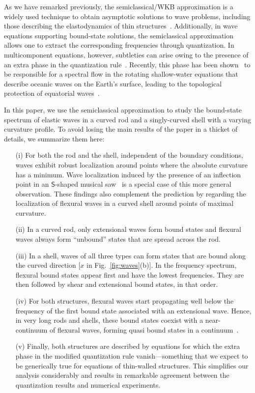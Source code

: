 As we have remarked previously, the semiclassical/WKB approximation is a widely used technique to obtain asymptotic solutions to wave problems, including those describing the elastodynamics of thin structures~\cite{pierce1970,nielsen2014,sndergaard2016,mohammed2021}.
Additionally, in wave equations supporting bound-state solutions, the semiclassical approximation allows one to extract the corresponding frequencies through quantization.
In multicomponent equations, however, subtleties can arise owing to the presence of an extra phase in the quantization rule~\cite{yabana1986,kaufman1987,littlejohn1991,littlejohn1991a}.
Recently, this phase has been shown~\cite{venaille2023} to be responsible for a spectral flow in the rotating shallow-water equations that describe oceanic waves on the Earth's surface, leading to the topological protection of equatorial waves~\cite{delplace2017}.

In this paper, we use the semiclassical approximation to study the bound-state spectrum of elastic waves in a curved rod and a singly-curved shell with a varying curvature profile.
To avoid losing the main results of the paper in a thicket of details, we summarize them here:
%
\begin{enumerate}
  \setlength\itemsep{0em}
  \item[(i)] For both the rod and the shell, independent of the boundary conditions, waves exhibit robust localization around points where the absolute curvature has a minimum.
    Wave localization induced by the presence of an inflection point in an $\mathsf{S}$-shaped musical saw~\cite{scott1992,shankar2022} is a special case of this more general observation.
    These findings also complement the prediction by \citet{mohammed2021} regarding the localization of flexural waves in a curved shell around points of maximal curvature.
  \item[(ii)] In a curved rod, only extensional waves form bound states and flexural waves always form ``unbound'' states that are spread across the rod.
  \item[(iii)] In a shell, waves of all three types can form states that are bound along the curved direction
    [$x$ in Fig.~\ref{fig:waves}(b)].
    In the frequency spectrum, flexural bound states appear first and have the lowest frequencies.
    They are then followed by shear and extensional bound states, in that order.
  \item[(iv)] For both structures, flexural waves start propagating well below the frequency of the first bound state associated with an extensional wave.
    Hence, in very long rods and shells, these bound states coexist with a near-continuum of flexural waves, forming quasi bound states in a continuum~\cite{hsu2016}.
  \item[(v)]
    Finally, both structures are described by equations for which the extra phase in the modified quantization rule vanish---something that we expect to be generically true for equations of thin-walled structures.
    This simplifies our analysis considerably and results in remarkable agreement between the quantization results and numerical experiments.
\end{enumerate}

